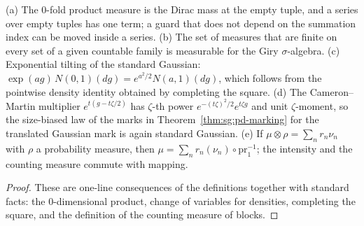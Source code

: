 \begin{lemma}\label{lem:sg:pd-tools}
  \leanok
  (a) The $0$-fold product measure is the Dirac mass at the empty tuple, and a series over empty tuples has one term; a guard that does not depend on the summation index can be moved inside a series. (b) The set of measures that are finite on every set of a given countable family is measurable for the Giry $\sigma$-algebra. (c) Exponential tilting of the standard Gaussian: $\exp(ag)\,N(0,1)(dg)=e^{a^2/2}N(a,1)(dg)$, which follows from the pointwise density identity obtained by completing the square. (d) The Cameron--Martin multiplier $e^{t(g-t\zeta/2)}$ has $\zeta$-th power $e^{-(t\zeta)^2/2}e^{t\zeta g}$ and unit $\zeta$-moment, so the size-biased law of the marks in Theorem~\ref{thm:sg:pd-marking} for the translated Gaussian mark is again standard Gaussian. (e) If $\mu\otimes\rho=\sum_nr_n\nu_n$ with $\rho$ a probability measure, then $\mu=\sum_nr_n(\nu_n)\circ\mathrm{pr}_1^{-1}$; the intensity and the counting measure commute with mapping.
\end{lemma}

\begin{proof}
  \leanok
These are one-line consequences of the definitions together with standard facts: the $0$-dimensional product, change of variables for densities, completing the square, and the definition of the counting measure of blocks.
\end{proof}

